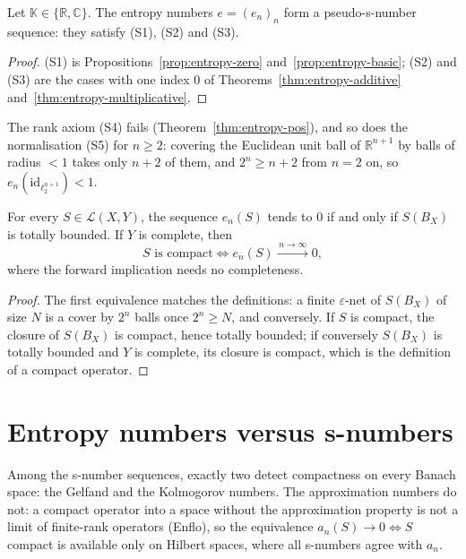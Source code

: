 \begin{theorem}
\label{thm:entropy-pseudo}
\leanok
{}
Let $\mathbb{K} \in \{\mathbb{R}, \mathbb{C}\}$. The entropy numbers
$e = (e_n)_n$ form a pseudo-\textup{s}-number sequence: they satisfy (S1),
(S2) and (S3).
\end{theorem}
\begin{proof}
\leanok
{}
(S1) is Propositions~\ref{prop:entropy-zero} and~\ref{prop:entropy-basic};
(S2) and (S3) are the cases with one index $0$ of
Theorems~\ref{thm:entropy-additive} and~\ref{thm:entropy-multiplicative}.
\end{proof}

The rank axiom (S4) fails (Theorem~\ref{thm:entropy-pos}), and so does the
normalisation (S5) for $n \ge 2$: covering the Euclidean unit ball of
$\mathbb{R}^{n+1}$ by balls of radius $< 1$ takes only $n + 2$ of them, and
$2^n \ge n + 2$ from $n = 2$ on, so $e_n(\mathrm{id}_{\ell_2^{n+1}}) < 1$.

\begin{theorem}
\label{thm:entropy-compact}
\leanok
{}
For every $S \in \mathcal{L}(X, Y)$, the sequence $e_n(S)$ tends to $0$ if
and only if $S(B_X)$ is totally bounded. If $Y$ is complete, then
\[
  S \text{ is compact} \iff e_n(S) \xrightarrow{\,n \to \infty\,} 0 ,
\]
where the forward implication needs no completeness.
\end{theorem}
\begin{proof}
\leanok
The first equivalence matches the definitions: a finite $\varepsilon$-net
of $S(B_X)$ of size $N$ is a cover by $2^n$ balls once $2^n \ge N$, and
conversely. If $S$ is compact, the closure of $S(B_X)$ is compact, hence
totally bounded; if conversely $S(B_X)$ is totally bounded and $Y$ is
complete, its closure is compact, which is the definition of a compact
operator.
\end{proof}

\chapter{Entropy numbers versus s-numbers}
\label{ch:entropy-bounds}

Among the s-number sequences, exactly two detect compactness on every
Banach space: the Gelfand and the Kolmogorov numbers. The approximation
numbers do not: a compact operator into a space without the approximation
property is not a limit of finite-rank operators (Enflo), so the
equivalence $a_n(S) \to 0 \iff S$ compact is available only on Hilbert
spaces, where all s-numbers agree with $a_n$.

